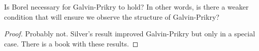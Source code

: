 \begin{question}
  Is Borel necessary for Galvin-Prikry to hold? In other words, is
  there a weaker condition that will ensure we observe the structure of
  Galvin-Prikry?
\end{question}
\begin{proof}
  Probably not. Silver's result improved Galvin-Prikry but only in a
  special case. There is a book with these results.
\end{proof}
